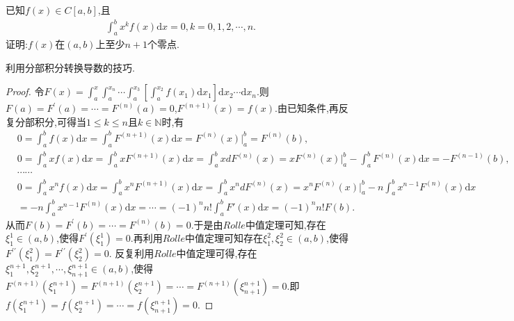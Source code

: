 \documentclass[../../main.tex]{subfiles}
\begin{document}
\begin{example}\label{example245574}
已知$f(x)\in C[a,b]$,且
\begin{align*}
\int_a^b{x^kf\left( x \right) \mathrm{d}x}=0, k=0,1,2,\cdots ,n .
\end{align*}
证明:$f(x)$在$(a,b)$上至少$n+1$个零点.
\end{example}
\begin{note}
利用分部积分转换导数的技巧.
\end{note}
\begin{proof}
令\(F(x)=\int_a^x\int_a^{x_n}\cdots\int_a^{x_3}\left[\int_a^{x_2}f(x_1)\mathrm{d}x_1\right]\mathrm{d}x_2\cdots \mathrm{d}x_n\).则\(F(a)=F^\prime(a)=\cdots=F^{(n)}(a)=0\),\(F^{(n + 1)}(x)=f(x)\).由已知条件,再反复分部积分,可得当\(1\leqslant k\leqslant n\)且\(k\in\mathbb{N}\)时,有
\begin{align*}
&0=\int_a^b{f\left( x \right) \mathrm{d}x}=\int_a^b{F^{\left( n+1 \right)}\left( x \right) \mathrm{d}x}=F^{\left( n \right)}\left( x \right) \Big|_{a}^{b}=F^{\left( n \right)}\left( b \right) ,
\\
&0=\int_a^b{xf\left( x \right) \mathrm{d}x}=\int_a^b{xF^{\left( n+1 \right)}\left( x \right) \mathrm{d}x}=\int_a^b{xdF^{\left( n \right)}\left( x \right)}=xF^{\left( n \right)}\left( x \right) \Big| _{a}^{b}-\int_a^b{F^{\left( n \right)}\left( x \right) \mathrm{d}x}=-F^{\left( n-1 \right)}\left( b \right) ,
\\
&\cdots \cdots 
\\
&0=\int_a^b{x^nf\left( x \right) \mathrm{d}x}=\int_a^b{x^nF^{\left( n+1 \right)}\left( x \right) \mathrm{d}x}=\int_a^b{x^ndF^{\left( n \right)}\left( x \right)}=x^nF^{\left( n \right)}\left( x \right) \Big| _{a}^{b}-n\int_a^b{x^{n-1}F^{\left( n \right)}\left( x \right) \mathrm{d}x}
\\
&=-n\int_a^b{x^{n-1}F^{\left( n \right)}\left( x \right) \mathrm{d}x}=\cdots =\left( -1 \right) ^nn!\int_a^b{F\prime\left( x \right) \mathrm{d}x}=\left( -1 \right) ^nn!F\left( b \right) .
\end{align*}
从而\(F(b)=F^\prime(b)=\cdots=F^{(n)}(b)=0\).于是由\(Rolle\)中值定理可知,存在\(\xi_1^1\in(a,b)\),使得\(F^\prime(\xi_1^1)=0\).再利用\(Rolle\)中值定理可知存在\(\xi_1^2,\xi_2^2\in(a,b)\),使得\(F^{\prime\prime}(\xi_1^2)=F^{\prime\prime}(\xi_2^2)=0\).
反复利用\(Rolle\)中值定理可得,存在\(\xi_1^{n + 1},\xi_2^{n + 1},\cdots,\xi_{n + 1}^{n + 1}\in(a,b)\),使得\(F^{(n + 1)}(\xi_1^{n + 1})=F^{(n + 1)}(\xi_2^{n + 1})=\cdots=F^{(n + 1)}(\xi_{n + 1}^{n + 1})=0\).即\(f(\xi_1^{n + 1})=f(\xi_2^{n + 1})=\cdots=f(\xi_{n + 1}^{n + 1})=0\).
\end{proof}
\end{document}
